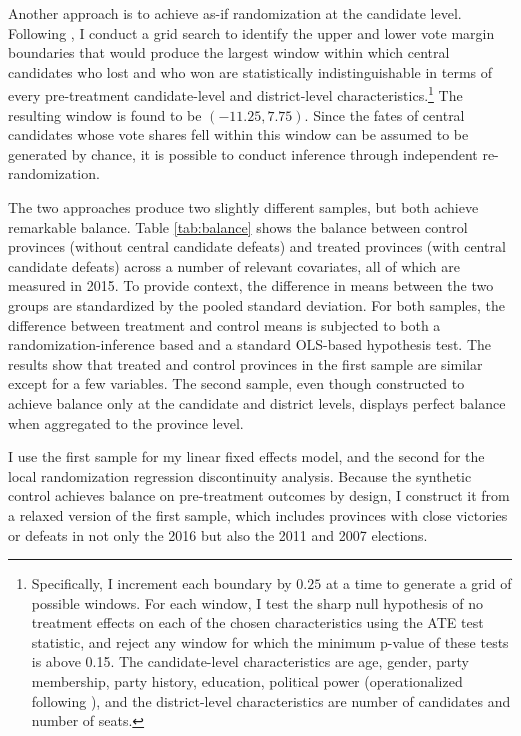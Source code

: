 \documentclass[12pt]{article}
\newcommand\fnote[1]{\footnote{\baselineskip=2\normalbaselineskip#1}}
\newcommand{\1}{\mathbbm{1}}
\begin{document}
Another approach is to achieve as-if randomization at the candidate level. Following \citet{CattaneoTitiunik2015}, I conduct a grid search to identify the upper and lower vote margin boundaries that would produce the largest window within which central candidates who lost and who won are statistically indistinguishable in terms of every pre-treatment candidate-level and district-level characteristics.\fnote{Specifically, I  increment each boundary by $0.25$ at a time to generate a grid of possible windows. For each window, I test the sharp null hypothesis of no treatment effects on each of the chosen characteristics using the ATE test statistic, and reject any window for which the minimum p-value of these tests is above 0.15. The candidate-level characteristics are age, gender, party membership, party history, education, political power (operationalized following \citet{MaleskySchuler2011}), and the district-level characteristics are number of candidates and number of seats.} The resulting window is found to be $(-11.25, 7.75)$. Since the fates of central candidates whose vote shares fell within this window can be assumed to be generated by chance, it is possible to conduct inference through independent re-randomization. 

The two approaches produce two slightly different samples, but both achieve remarkable balance. Table \ref{tab:balance} shows the balance between control provinces (without central candidate defeats) and treated provinces (with central candidate defeats) across a number of relevant covariates, all of which are measured in 2015. To provide context, the difference in means between the two groups are standardized by the pooled standard deviation. For both samples, the difference between treatment and control means is subjected to both a randomization-inference based and a standard OLS-based hypothesis test. The results show that treated and control provinces in the first sample are similar except for a few variables. The second sample, even though constructed to achieve balance only at the candidate and district levels, displays perfect balance when aggregated to the province level. 

I use the first sample for my linear fixed effects model, and the second for the local randomization regression discontinuity analysis. Because the synthetic control achieves balance on pre-treatment outcomes by design, I construct it from a relaxed version of the first sample, which includes provinces with close victories or defeats in not only the 2016 but also the 2011 and 2007 elections.
\end{document}
